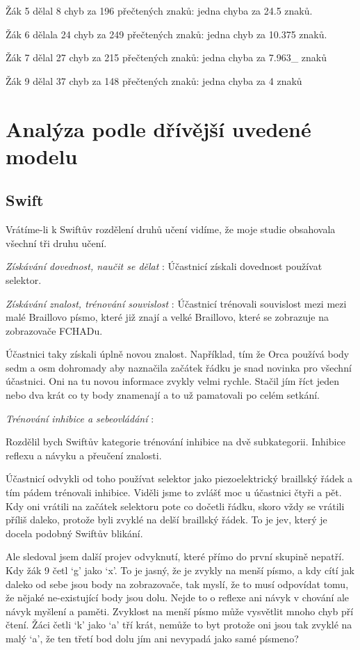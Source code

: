 Žák 5 dělal 8 chyb za 196 přečtených znaků: jedna chyba za 24.5 znaků.

Žák 6 dělala 24 chyb za 249 přečtených znaků: jedna chyb za 10.375 znaků.

Žák 7 dělal 27 chyb za 215 přečtených znaků: jedna chyba za 7.963\_{} znaků

Žák 9 dělal 37 chyb za 148 přečtených znaků: jedna chyba za 4 znaků

\section{Analýza podle dřívější uvedené modelu}

\subsection{Swift}
Vrátíme-li k Swiftův rozdělení druhů učení vidíme, že moje studie obsahovala všechní tři druhu učení.

\textit{Získávání dovednost, naučit se dělat} :
Účastnicí získali dovednost používat selektor.

\textit{Získávání znalost, trénování souvislost} :
Účastnicí trénovali souvislost mezi mezi malé Braillovo písmo, které již znají a velké Braillovo, které se zobrazuje na zobrazovače FCHADu.

Účastnici taky získali úplně novou znalost.  Například, tím že Orca používá body sedm a osm dohromady aby naznačila začátek řádku je snad novinka pro všechní účastnici.  Oni na tu novou informace zvykly velmi rychle.  Stačil jím říct jeden nebo dva krát co ty body znamenají a to už pamatovali po celém setkání.


\textit{Trénování inhibice a sebeovládání} :

Rozdělil bych Swiftův kategorie trénování inhibice na dvě subkategorii.  Inhibice reflexu a návyku a přeučení znalosti.

Účastnicí odvykli od toho používat selektor jako piezoelektrický braillský řádek a tím pádem trénovali inhibice.  Viděli jsme to zvlášť moc u účastnici čtyři a pět.  Kdy oni vrátili na začátek selektoru pote co dočetli řádku, skoro vždy se vrátili příliš daleko, protože byli zvyklé na delší braillský řádek.  To je jev, který je docela podobný Swiftův blikání.

Ale sledoval jsem další projev odvyknutí, které přímo do první skupině nepatří. Kdy žák 9 četl `g' jako `x'. To je jasný, že je zvykly na menší písmo, a kdy cítí jak daleko od sebe jsou body na zobrazovače, tak myslí, že to musí odpovídat tomu, že nějaké ne-existující body jsou dolu.  Nejde to o reflexe ani návyk v chování ale návyk myšlení a paměti.  Zvyklost na menší písmo může vysvětlit mnoho chyb pří čtení.  Žáci četli `k' jako `a' tří krát, nemůže to byt protože oni jsou tak zvyklé na malý `a', že ten třetí bod dolu jím ani nevypadá jako samé písmeno?

